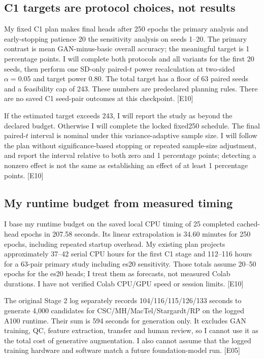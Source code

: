 \documentclass[11pt,a4paper]{article}
\newcommand{\ev}[1]{\textcolor{Link}{\textsf{[#1]}}}
\newcommand{\pp}{percentage points}
\newcommand{\HeadMinutes}{34.60}
\newcommand{\TimingSeconds}{207.58}
\begin{document}
\subsection{C1 targets are protocol choices, not results}

My fixed C1 plan makes final heads after 250 epochs the primary analysis
and early-stopping patience 20 the sensitivity analysis on seeds 1--20.
The primary contrast is mean GAN-minus-basic overall accuracy; the meaningful
target is 1 \pp. I will complete both protocols and all variants for the first
20 seeds, then perform one SD-only paired-$t$ power recalculation at two-sided
$\alpha=0.05$ and target power 0.80. The total target has a floor of 63 paired
seeds and a feasibility cap of 243. These numbers are predeclared planning
rules. There are no saved C1 seed-pair outcomes at this checkpoint. \ev{E10}

If the estimated target exceeds 243, I will report the study as beyond the
declared budget. Otherwise I will complete the locked fixed250 schedule.
The final paired-$t$ interval is nominal under this variance-adaptive sample
size. I will follow the plan without significance-based stopping or repeated
sample-size adjustment, and report the interval relative to both zero and
1 \pp; detecting a nonzero effect is not the same as
establishing an effect of at least 1 \pp. \ev{E10}

\subsection{My runtime budget from measured timing}

I base my runtime budget on the saved local CPU timing of 25 completed
cached-head epochs in \TimingSeconds{} seconds. Its linear extrapolation is
\HeadMinutes{} minutes for 250 epochs, including repeated startup overhead.
My existing plan projects approximately 37--42 serial CPU hours for the first
C1 stage and 112--116 hours for a 63-pair primary study including es20
sensitivity. Those totals assume 20--50 epochs for the es20 heads; I treat them
as forecasts, not measured Colab durations. I have not verified Colab CPU/GPU
speed or session limits.
\ev{E10}

The original Stage 2 log separately records 104/116/115/126/133 seconds to
generate 4,000 candidates for CSC/MH/MacTel/Stargardt/RP on the logged A100
runtime. Their sum is 594 seconds for generation only. It excludes GAN
training, QC, feature extraction, transfer and human review, so I cannot use
it as the total cost of generative augmentation. I also cannot assume that
the logged training hardware and software match a future foundation-model run.
\ev{E05}
\end{document}
